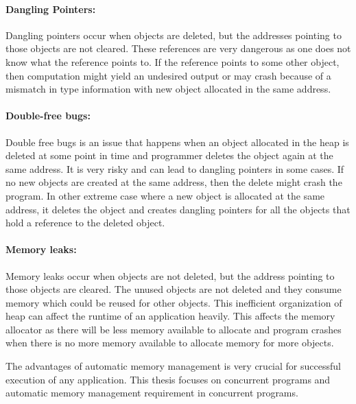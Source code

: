 \paragraph{Dangling Pointers:}
Dangling pointers occur when objects are deleted, but the addresses pointing to those objects are not cleared.
These references are very dangerous as one does not know what the reference points to. If the reference points to some other object, then computation might yield an undesired output or may crash because of a mismatch in type information with new object allocated in the same address. 
\paragraph{Double-free bugs:}
Double free bugs is an issue that happens when an object allocated in the heap is deleted at some point in time and programmer deletes the object again at the same address. It is very risky and can lead to dangling pointers in some cases. If no new objects are created at the same address, then the delete might crash the program. In other extreme case where a new object is allocated at the same address, it deletes the object and creates dangling pointers for all the objects that hold a reference to the deleted object. 
\paragraph{Memory leaks:}
Memory leaks occur when objects are not deleted, but the address pointing to those objects are cleared. The unused objects are not deleted and they consume memory which could be reused for other objects. This inefficient organization of heap can affect the runtime of an application heavily. This affects the memory allocator as there will be less memory available to allocate and program crashes when there is no more memory available to allocate memory for more objects.


The advantages of automatic memory management is very crucial for successful execution of any application. This thesis focuses on concurrent programs and automatic memory management requirement in concurrent programs. 

